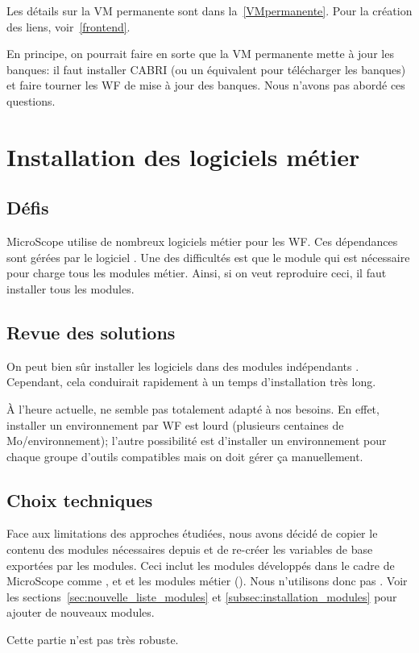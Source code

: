 Les détails sur la VM permanente sont dans la~\autoref{VMpermanente}.
Pour la création des liens, voir~\autoref{frontend}.

En principe, on pourrait faire en sorte que la VM permanente mette à jour les banques:
il faut installer CABRI (ou un équivalent pour télécharger les banques) et faire tourner les WF de mise à jour des banques.
Nous n'avons pas abordé ces questions.

\section{Installation des logiciels métier} \label{sec:installation_logiciels_metier}

\subsection{Défis}

MicroScope utilise de nombreux logiciels métier pour les WF.
Ces dépendances sont gérées par le logiciel .
Une des difficultés est que le module  qui est nécessaire pour 
charge tous les modules métier.
Ainsi, si on veut reproduire ceci, il faut installer tous les modules.

\subsection{Revue des solutions}

On peut bien sûr installer les logiciels dans des modules indépendants .
Cependant, cela conduirait rapidement à un temps d'installation très long.

À l'heure actuelle,  ne semble pas totalement adapté à nos besoins.
En effet, installer un environnement par WF est lourd (plusieurs centaines de Mo/environnement);
l'autre possibilité est d'installer un environnement pour chaque groupe d'outils compatibles mais on doit gérer ça manuellement.

\subsection{Choix techniques}

Face aux limitations des approches étudiées, nous avons décidé de copier le contenu des modules nécessaires depuis 
et de re-créer les variables de base exportées par les modules.
Ceci inclut les modules développés dans le cadre de MicroScope comme ,  et 
et les modules métier ().
Nous n'utilisons donc pas .
Voir les sections~\ref{sec:nouvelle_liste_modules} et \ref{subsec:installation_modules} pour ajouter de nouveaux modules.


Cette partie n'est pas très robuste.
